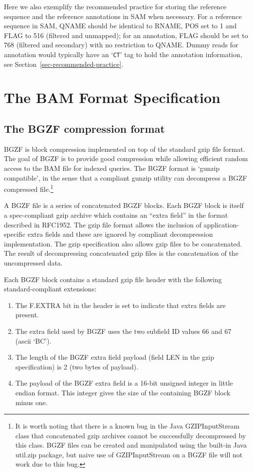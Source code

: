 \documentclass[10pt]{article}
\begin{document}
Here we also exemplify the recommended practice for storing the reference
sequence and the reference annotations in SAM when necessary. For a reference
sequence in SAM, {\sf QNAME} should be identical to {\sf RNAME}, {\sf POS} set
to 1 and {\sf FLAG} to 516 (filtered and unmapped); for an annotation, {\sf
FLAG} should be set to 768 (filtered and secondary) with no restriction to {\sf
QNAME}. Dummy reads for annotation would typically have an `{\tt CT}' tag to
hold the annotation information, see Section~\ref{sec-recommended-practice}.

\pagebreak

\section{The BAM Format Specification}

\subsection{The BGZF compression format}

BGZF is block compression implemented on top of the standard gzip file
format. The goal of BGZF is to provide good compression while allowing
efficient random access to the BAM file for indexed queries. The BGZF
format is `gunzip compatible', in the sense that a compliant gunzip
utility can decompress a BGZF compressed file.\footnote{It is worth noting that there is a known bug in the Java {\sf
  GZIPInputStream} class that concatenated gzip archives cannot be
successfully decompressed by this class. BGZF files can be created and
manipulated using the built-in Java {\sf util.zip} package, but naive
use of {\sf GZIPInputStream} on a BGZF file will not work due to this
bug.}

A BGZF file is a series of concatenated BGZF blocks. Each BGZF block
is itself a spec-compliant gzip archive which contains an ``extra field''
in the format described in RFC1952. The gzip file format allows the
inclusion of application-specific extra fields and these are ignored by
compliant decompression implementation. The gzip specification also
allows gzip files to be concatenated. The result of decompressing
concatenated gzip files is the concatenation of the uncompressed data.

Each BGZF block contains a standard gzip file header with the following
standard-compliant extensions:

\begin{enumerate}
\item The {\sf F.EXTRA} bit in the header is set to indicate that extra
  fields are present.
\item The extra field used by BGZF uses the two subfield ID values 66 and 67 (ascii `BC').
\item The length of the BGZF extra field payload (field {\sf LEN} in the
  gzip specification) is 2 (two bytes of payload).
\item The payload of the BGZF extra field is a 16-bit unsigned integer
  in little endian format. This integer gives the size of the containing
  BGZF block minus one.
\end{enumerate}
\end{document}
